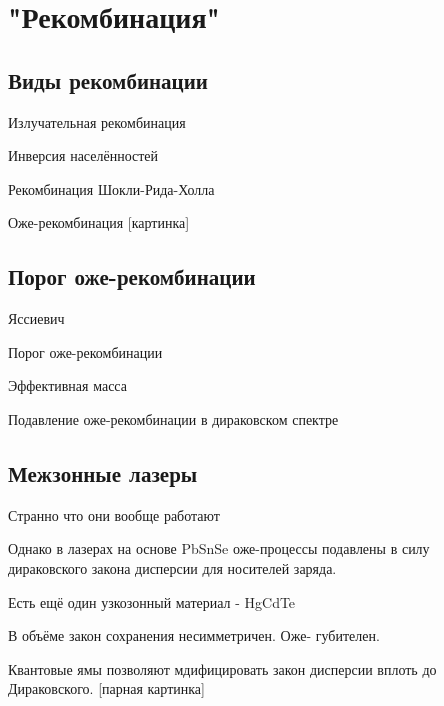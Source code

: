 \documentclass[../main.tex]{subfiles}
\begin{document}
    \chapter{"Рекомбинация"}
    \section{Виды рекомбинации}

    Излучательная рекомбинация

    Инверсия населённостей

    Рекомбинация Шокли-Рида-Холла

    Оже-рекомбинация [картинка]

    \section{Порог оже-рекомбинации}

    Яссиевич

    Порог оже-рекомбинации

    Эффективная масса

    Подавление оже-рекомбинации в дираковском спектре

    \section{Межзонные лазеры}

    Странно что они вообще работают

    Однако в лазерах на основе PbSnSe оже-процессы подавлены в силу
    дираковского закона дисперсии для носителей заряда.

    Есть ещё один узкозонный материал - HgCdTe

    В  объёме закон сохранения несимметричен. Оже- губителен.

    Квантовые ямы позволяют мдифицировать закон дисперсии вплоть до 
    Дираковского. [парная картинка]
\end{document}
